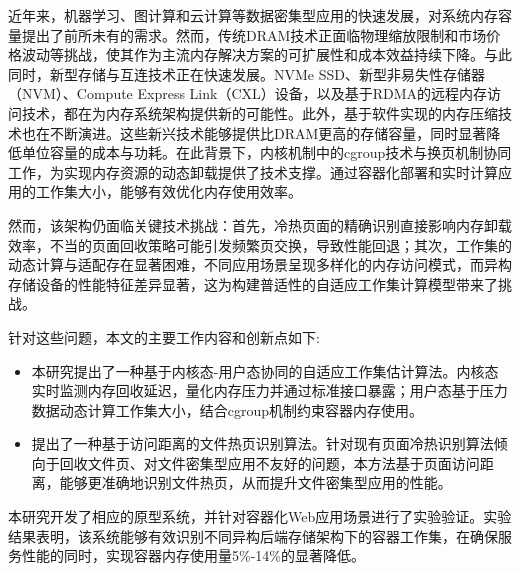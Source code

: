 	
\begin{chineseabstract}

近年来，机器学习、图计算和云计算等数据密集型应用的快速发展，对系统内存容量提出了前所未有的需求。然而，传统DRAM技术正面临物理缩放限制和市场价格波动等挑战，使其作为主流内存解决方案的可扩展性和成本效益持续下降。与此同时，新型存储与互连技术正在快速发展。NVMe SSD、新型非易失性存储器（NVM）、Compute Express Link（CXL）设备，以及基于RDMA的远程内存访问技术，都在为内存系统架构提供新的可能性。此外，基于软件实现的内存压缩技术也在不断演进。这些新兴技术能够提供比DRAM更高的存储容量，同时显著降低单位容量的成本与功耗。在此背景下，内核机制中的cgroup技术与换页机制协同工作，为实现内存资源的动态卸载提供了技术支撑。通过容器化部署和实时计算应用的工作集大小，能够有效优化内存使用效率。

然而，该架构仍面临关键技术挑战：首先，冷热页面的精确识别直接影响内存卸载效率，不当的页面回收策略可能引发频繁页交换，导致性能回退；其次，工作集的动态计算与适配存在显著困难，不同应用场景呈现多样化的内存访问模式，而异构存储设备的性能特征差异显著，这为构建普适性的自适应工作集计算模型带来了挑战。

针对这些问题，本文的主要工作内容和创新点如下:
\begin{itemize}
    \item 本研究提出了一种基于内核态-用户态协同的自适应工作集估计算法。内核态实时监测内存回收延迟，量化内存压力并通过标准接口暴露；用户态基于压力数据动态计算工作集大小，结合cgroup机制约束容器内存使用。
    \item 提出了一种基于访问距离的文件热页识别算法。针对现有页面冷热识别算法倾向于回收文件页、对文件密集型应用不友好的问题，本方法基于页面访问距离，能够更准确地识别文件热页，从而提升文件密集型应用的性能。
\end{itemize}

本研究开发了相应的原型系统，并针对容器化Web应用场景进行了实验验证。实验结果表明，该系统能够有效识别不同异构后端存储架构下的容器工作集，在确保服务性能的同时，实现容器内存使用量5\%-14\%的显著降低。

\end{chineseabstract}
